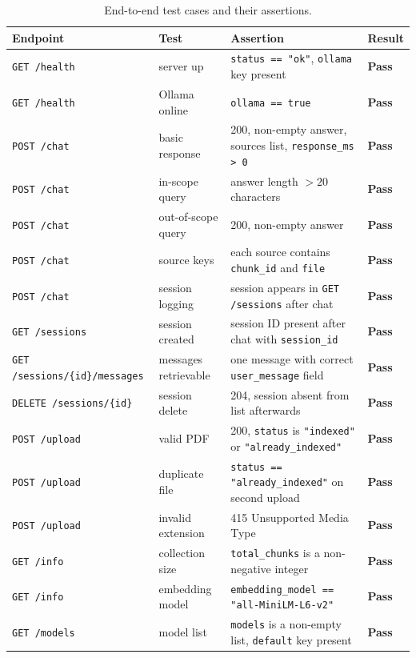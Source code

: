 \begin{table}[H]
    \centering
    \small\begin{tabular}{|l|l|p{}|l|}
        \hline
        \textbf{Endpoint} & \textbf{Test} & \textbf{Assertion} & \textbf{Result} \\
        \hline \hline
        \texttt{GET /health}   & server up         & \texttt{status == "ok"}, \texttt{ollama} key present & \textbf{Pass} \\
        \hline
        \texttt{GET /health}   & Ollama online     & \texttt{ollama == true} & \textbf{Pass} \\
        \hline
        \texttt{POST /chat}    & basic response    & 200, non-empty answer, sources list, \texttt{response\_ms > 0} & \textbf{Pass} \\
        \hline
        \texttt{POST /chat}    & in-scope query    & answer length $> 20$ characters & \textbf{Pass} \\
        \hline
        \texttt{POST /chat}    & out-of-scope query & 200, non-empty answer & \textbf{Pass} \\
        \hline
        \texttt{POST /chat}    & source keys       & each source contains \texttt{chunk\_id} and \texttt{file} & \textbf{Pass} \\
        \hline
        \texttt{POST /chat}    & session logging   & session appears in \texttt{GET /sessions} after chat & \textbf{Pass} \\
        \hline
        \texttt{GET /sessions} & session created   & session ID present after chat with \texttt{session\_id} & \textbf{Pass} \\
        \hline
        \texttt{GET /sessions/\{id\}/messages} & messages retrievable & one message with correct \texttt{user\_message} field & \textbf{Pass} \\
        \hline
        \texttt{DELETE /sessions/\{id\}} & session delete & 204, session absent from list afterwards & \textbf{Pass} \\
        \hline
        \texttt{POST /upload}  & valid PDF         & 200, \texttt{status} is \texttt{"indexed"} or \texttt{"already\_indexed"} & \textbf{Pass} \\
        \hline
        \texttt{POST /upload}  & duplicate file    & \texttt{status == "already\_indexed"} on second upload & \textbf{Pass} \\
        \hline
        \texttt{POST /upload}  & invalid extension & 415 Unsupported Media Type & \textbf{Pass} \\
        \hline
        \texttt{GET /info}     & collection size   & \texttt{total\_chunks} is a non-negative integer & \textbf{Pass} \\
        \hline
        \texttt{GET /info}     & embedding model   & \texttt{embedding\_model == "all-MiniLM-L6-v2"} & \textbf{Pass} \\
        \hline
        \texttt{GET /models}   & model list        & \texttt{models} is a non-empty list, \texttt{default} key present & \textbf{Pass} \\
        \hline
    \end{tabular}
    \caption{End-to-end test cases and their assertions.}
    \label{tab:e2e-tests}
\end{table}


